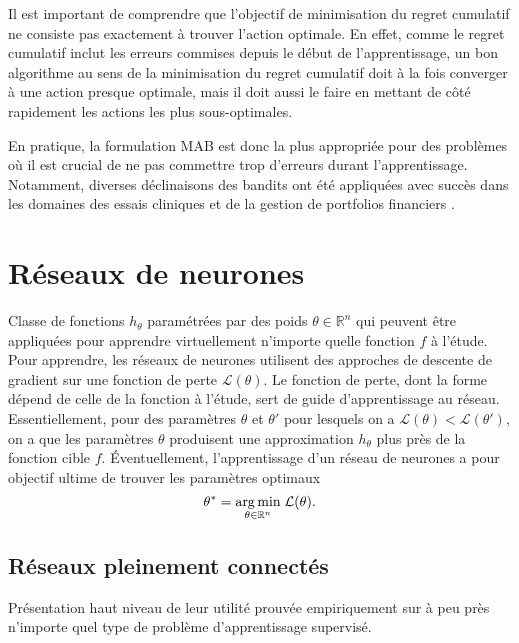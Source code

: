 Il est important de comprendre que l'objectif de minimisation du regret cumulatif
ne consiste pas exactement à trouver l'action optimale.
En effet, comme le regret cumulatif inclut les erreurs commises
depuis le début de l'apprentissage, un bon algorithme au sens de la minimisation
du regret cumulatif doit à la fois converger à une action presque optimale, mais il
doit aussi le faire en mettant de côté rapidement les actions les plus sous-optimales.

En pratique, la formulation MAB est donc la plus appropriée pour des problèmes
où il est crucial de ne pas commettre trop d'erreurs durant l'apprentissage.
Notamment, diverses déclinaisons des bandits ont été appliquées avec succès dans
les domaines des essais cliniques \citep{kuleshov2014algorithms} et de
la gestion de portfolios financiers \citep{10.5555/2832249.2832384}.

\section{Réseaux de neurones}

Classe de fonctions $h_\theta$ paramétrées par des poids $\theta \in \mathbb{R}^n$ qui peuvent être appliquées pour apprendre
virtuellement n'importe quelle fonction $f$ à l'étude.
Pour apprendre, les réseaux de neurones utilisent des approches de
descente de gradient sur une fonction de perte $\mathcal{L}(\theta)$.
Le fonction de perte, dont la forme dépend de celle de la fonction
à l'étude, sert de guide d'apprentissage au réseau.
Essentiellement, pour des paramètres $\theta$ et $\theta'$
pour lesquels on a $\mathcal{L}(\theta) < \mathcal{L}(\theta')$, on a
que les paramètres $\theta$ produisent une approximation $h_\theta$
plus près de la fonction cible $f$.
Éventuellement, l'apprentissage d'un réseau de neurones a pour objectif
ultime de trouver les paramètres optimaux
\begin{equation*}
    \theta^* = \underset{\theta \in \mathbb{R}^n}{\operatorname*{arg\,min}} \; \mathcal{L}(\theta).
\end{equation*}

\subsection{Réseaux pleinement connectés}

Présentation haut niveau de leur utilité prouvée empiriquement
sur à peu près n'importe quel type de problème d'apprentissage
supervisé.

